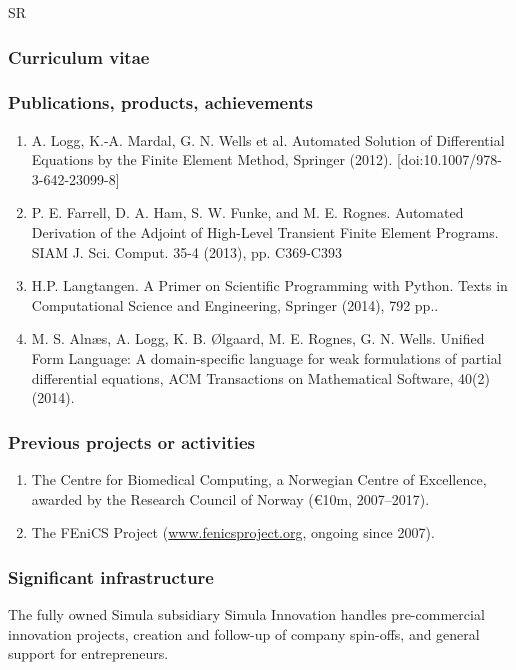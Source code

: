 \begin{sitedescription}{SR}
\subsubsection*{Curriculum vitae}




%

\subsubsection*{Publications, products, achievements}

\begin{enumerate}
\item  A. Logg, K.-A. Mardal, G. N. Wells et al. Automated Solution of Differential Equations by the Finite Element Method, Springer (2012). [doi:10.1007/978-3-642-23099-8]
\item P. E. Farrell, D. A. Ham, S. W. Funke, and M. E. Rognes.	Automated Derivation of the Adjoint of High-Level Transient Finite Element Programs. SIAM J. Sci. Comput. 35-4 (2013), pp. C369-C393
\item H.P. Langtangen. A Primer on Scientific Programming with Python. Texts in Computational Science and Engineering, Springer (2014), 792 pp..
\item M. S. Aln\ae s, A. Logg, K. B. \O lgaard, M. E. Rognes, G. N. Wells. Unified Form Language: A domain-specific language for weak formulations of partial differential equations, ACM Transactions on Mathematical Software, 40(2) (2014).
\end{enumerate}

\subsubsection*{Previous projects or activities}

\begin{enumerate}
\item The Centre for Biomedical Computing, a Norwegian Centre of Excellence, awarded by the Research Council of Norway (\euro 10m, 2007--2017).
\item The FEniCS Project (\url{www.fenicsproject.org}, ongoing since 2007). 
\end{enumerate}

\subsubsection*{Significant infrastructure}

The fully owned Simula subsidiary Simula Innovation handles pre-commercial innovation projects, creation and follow-up of company spin-offs, and general support for entrepreneurs.
\end{sitedescription}



